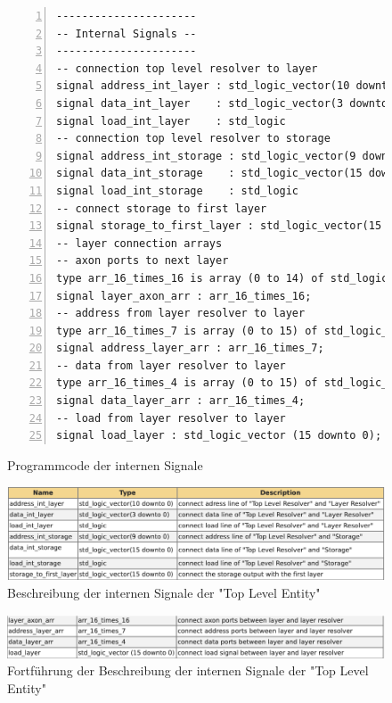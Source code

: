 \documentclass{article}
\numberwithin{equation}{section}
\begin{document}
\begin{figure}[htbp]
\begin{lstlisting}[style=VHDL,numbers=left,stepnumber=1,style=myCustomMatlabStyle,basicstyle=\footnotesize]
----------------------
-- Internal Signals --
----------------------
-- connection top level resolver to layer
signal address_int_layer : std_logic_vector(10 downto 0) := (others => '0'); 
signal data_int_layer    : std_logic_vector(3 downto 0)  := (others => '0');
signal load_int_layer    : std_logic                     := '0';
-- connection top level resolver to storage
signal address_int_storage : std_logic_vector(9 downto 0)  := (others => '0');
signal data_int_storage    : std_logic_vector(15 downto 0) := (others => '0');
signal load_int_storage    : std_logic                     := '0';
-- connect storage to first layer
signal storage_to_first_layer : std_logic_vector(15 downto 0) := (others => '0');
-- layer connection arrays
-- axon ports to next layer
type arr_16_times_16 is array (0 to 14) of std_logic_vector(15 downto 0);
signal layer_axon_arr : arr_16_times_16;
-- address from layer resolver to layer
type arr_16_times_7 is array (0 to 15) of std_logic_vector(6 downto 0);
signal address_layer_arr : arr_16_times_7;
-- data from layer resolver to layer
type arr_16_times_4 is array (0 to 15) of std_logic_vector(3 downto 0);
signal data_layer_arr : arr_16_times_4;
-- load from layer resolver to layer
signal load_layer : std_logic_vector (15 downto 0);
\end{lstlisting}
\caption{Programmcode der internen Signale} \label{code:internal_signals}
\end{figure}
\begin{figure}[htb!]
    \begin{center}
      \includegraphics[width=13.25cm]{ModuleDescription/internal_signals1.png}
    \end{center}
    \caption{Beschreibung der internen Signale der "Top Level Entity"} \label{fig:internal_signals1}
  \end{figure}
\FloatBarrier
\begin{figure}[htb!]
    \begin{center}
      \includegraphics[width=13.25cm]{ModuleDescription/internal_signals2.png}
    \end{center}
    \caption{Fortführung der Beschreibung der internen Signale der "Top Level Entity"} \label{fig:internal_signals2}
  \end{figure}
\end{document}
